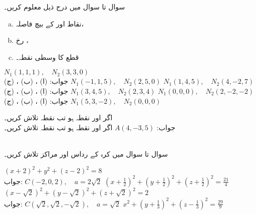 سوال  تا سوال  میں درج ذیل معلوم کریں۔
\begin{enumerate}[a.]
\item
نقاط  اور  کے بیچ فاصلہ،
\item
رخ ،
\item
قطع  کا وسطی نقطہ۔
\end{enumerate}

$N_1(1,1,1),\quad N_2(3,3,0)$\\
جواب:\quad
(ا) ، (ب) ، (ج) 
$N_1(-1,1,5),\quad N_2(2,5,0)$
$N_1(1,4,5),\quad N_2(4,-2,7)$\\
جواب:\quad
(ا) ، (ب) ، (ج) 
$N_1(3,4,5),\quad N_2(2,3,4)$
$N_1(0,0,0),\quad N_2(2,-2,-2)$\\
جواب:\quad
(ا) ، (ب) ، (ج) 
$N_1(5,3,-2),\quad N_2(0,0,0)$

اگر  اور  نقطہ  ہو تب نقطہ  تلاش کریں۔\\
جواب:\quad
$A(4,-3,5)$
اگر  اور  نقطہ  ہو تب نقطہ  تلاش کریں۔

\\
سوال  تا سوال  میں کرہ کے رداس اور مراکز تلاش کریں۔

$(x+2)^2+y^2+(z-2)^2=8$\\
جواب:\quad
$C(-2,0,2),\quad a=2\sqrt{2}$
$(x+\tfrac{1}{2})^2+(y+\tfrac{1}{2})^2+(z+\tfrac{1}{2})^2=\tfrac{21}{4}$
$(x-\sqrt{2})^2+(y-\sqrt{2})^2+(z+\sqrt{2})^2=2$\\
جواب:\quad
$C(\sqrt{2},\sqrt{2},-\sqrt{2}),\quad a=\sqrt{2}$
$x^2+(y+\tfrac{1}{3})^2+(z-\tfrac{1}{3})^2=\tfrac{29}{9}$

